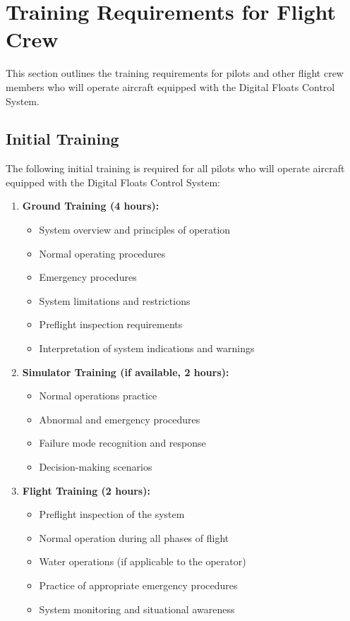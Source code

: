 \documentclass[12pt,a4paper,twoside,openright]{book}
\begin{document}
\section{Training Requirements for Flight Crew}

This section outlines the training requirements for pilots and other flight crew members who will operate aircraft equipped with the Digital Floats Control System.

\subsection{Initial Training}

The following initial training is required for all pilots who will operate aircraft equipped with the Digital Floats Control System:

\begin{enumerate}
    \item \textbf{Ground Training (4 hours):}
    \begin{itemize}
        \item System overview and principles of operation
        \item Normal operating procedures
        \item Emergency procedures
        \item System limitations and restrictions
        \item Preflight inspection requirements
        \item Interpretation of system indications and warnings
    \end{itemize}
    
    \item \textbf{Simulator Training (if available, 2 hours):}
    \begin{itemize}
        \item Normal operations practice
        \item Abnormal and emergency procedures
        \item Failure mode recognition and response
        \item Decision-making scenarios
    \end{itemize}
    
    \item \textbf{Flight Training (2 hours):}
    \begin{itemize}
        \item Preflight inspection of the system
        \item Normal operation during all phases of flight
        \item Water operations (if applicable to the operator)
        \item Practice of appropriate emergency procedures
        \item System monitoring and situational awareness
    \end{itemize}
    

\end{enumerate}
\end{document}
